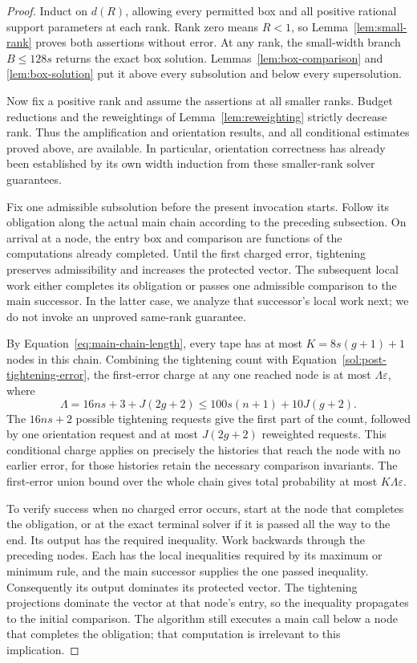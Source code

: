 \begin{proof}
Induct on \(d(R)\), allowing every permitted box and all positive
rational support parameters at each rank. Rank zero means \(R<1\),
so Lemma~\ref{lem:small-rank} proves both assertions without error.
At any rank, the small-width branch \(B\le128s\) returns the exact
box solution. Lemmas~\ref{lem:box-comparison} and
\ref{lem:box-solution} put it above every subsolution and below
every supersolution.

Now fix a positive rank and assume the assertions at all smaller
ranks. Budget reductions and the reweightings of
Lemma~\ref{lem:reweighting} strictly decrease rank. Thus the
amplification and orientation results, and all conditional estimates
proved above, are available. In particular, orientation correctness
has already been established by its own width induction from these
smaller-rank solver guarantees.

Fix one admissible subsolution before the present invocation starts.
Follow its obligation along the actual main chain according to the
preceding subsection. On arrival at a node, the entry box and
comparison are functions of the computations already completed.
Until the first charged error, tightening preserves admissibility
and increases the protected vector. The subsequent local work either
completes its obligation or passes one admissible comparison to the
main successor. In the latter case, we analyze that successor's
local work next; we do not invoke an unproved same-rank guarantee.

By Equation~\eqref{eq:main-chain-length}, every tape has at most
\(K=8s(g+1)+1\) nodes in this chain. Combining the tightening count
with Equation~\eqref{sol:post-tightening-error}, the first-error
charge at any one reached node is at most
\(\Lambda\varepsilon\), where
\begin{equation}
 \Lambda=16ns+3+J(2g+2)
 \le 100s(n+1)+10J(g+2).
 \label{sol:node-error}
\end{equation}
The \(16ns+2\) possible tightening requests give the first part of
the count, followed by one orientation request and at most
\(J(2g+2)\) reweighted requests. This conditional charge applies
on precisely the histories that reach the node with no earlier
error, for those histories retain the necessary comparison
invariants. The first-error union bound over the whole chain gives
total probability at most \(K\Lambda\varepsilon\).

To verify success when no charged error occurs, start at the node
that completes the obligation, or at the exact terminal solver if
it is passed all the way to the end. Its output has the required
inequality. Work backwards through the preceding nodes. Each has
the local inequalities required by its maximum or minimum rule,
and the main successor supplies the one passed inequality.
Consequently its output dominates its protected vector. The
tightening projections dominate the vector at that node's entry,
so the inequality propagates to the initial comparison. The
algorithm still executes a main call below a node that completes
the obligation; that computation is irrelevant to this implication.


\end{proof}
